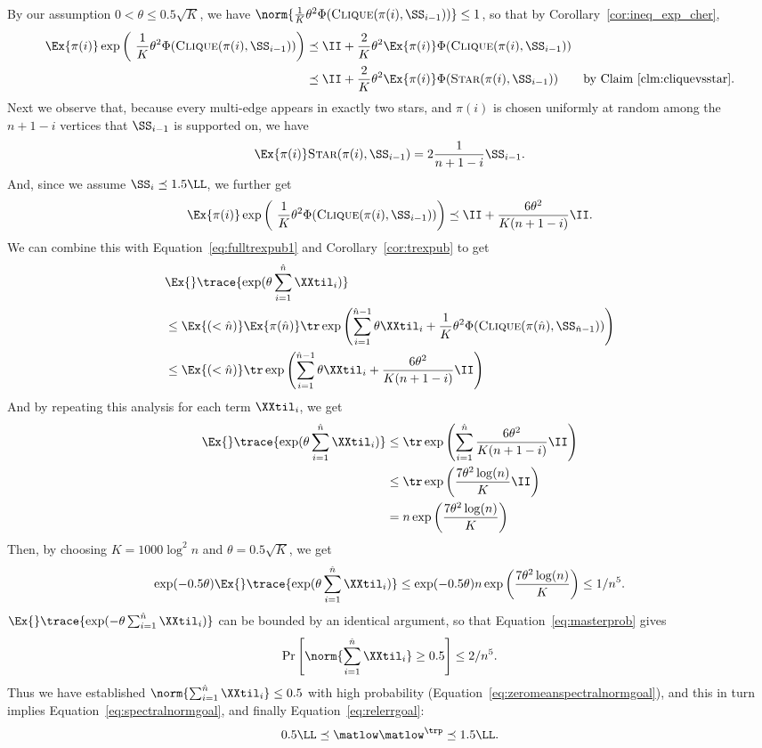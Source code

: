 By our assumption $0 <\theta \leq 0.5\sqrt{K}$, we have
$\norm{\frac{1}{K}\theta^2\Phi(\vcliq{\pi(i)}{\SS_{i-1}})}
\leq 1$, so that by Corollary~\ref{cor:ineq_exp_cher},
\begin{align}
  \Ex{\pi(i)}
  \exp\left(\
     \frac{1}{K}\theta^2\Phi(\vcliq{\pi(i)}{\SS_{i-1}})
  \right)
  &\preceq
  \II
  +
  \frac{2}{K} \theta^2\Ex{\pi(i)}
    \Phi(\vcliq{\pi(i)}{\SS_{i-1}})
  \\
  &\preceq
  \II
  +
  \frac{2}{K} \theta^2\Ex{\pi(i)}
  \Phi(\vstar{\pi(i)}{\SS_{i-1}})
  \tag*{by Claim~\ref{clm:cliquevsstar}.}
\end{align}
Next we observe that, because every multi-edge appears in exactly two
stars, and $\pi(i)$ is chosen uniformly at random among the $n+1-i$
vertices that $\SS_{i-1}$ is supported on, we have
\[
  \Ex{\pi(i)}
  \vstar{\pi(i)}{\SS_{i-1}}
  =
  2\frac{1}{n+1-i}\SS_{i-1}
  .
\]
And, since we assume $\SS_{i} \preceq 1.5 \LL$, we further get
\[
  \Ex{\pi(i)}
  \exp\left(\
     \frac{1}{K}\theta^2\Phi(\vcliq{\pi(i)}{\SS_{i-1}})
  \right)
  \preceq
  \II
  +
  \frac{6\theta^2}{K(n+1-i)}\II
  .
\]
We can combine this with Equation~\eqref{eq:fulltrexpub1} and
Corollary~\ref{cor:trexpub} to get
\begin{align*}
  &  \Ex{}\trace{\exp(\theta\sum_{i = 1}^{\hat{n}}\XXtil_{i} )}
     \\*  \nonumber
  &  \leq
    \Ex{(<\hat{n})} \Ex{\pi(\hat{n})}
   \tr\exp\left(\sum_{i = 1}^{\hat{n}-1}\theta\XXtil_{i}
     +
     \frac{1}{K}\theta^2\Phi(\vcliq{\pi(\hat{n})}{\SS_{\hat{n}-1}})
    \right)
\\  \nonumber
  &  \leq
    \Ex{(<\hat{n})}
   \tr\exp\left(\sum_{i = 1}^{\hat{n}-1}\theta\XXtil_{i}
     +
    \frac{6\theta^2}{K(n+1-i)}\II
  \right)
\end{align*}
And by repeating this analysis for each term $\XXtil_{i}$, we get
\begin{align*}
 \Ex{}\trace{\exp(\theta\sum_{i = 1}^{\hat{n}}\XXtil_{i} )}
&\leq
   \tr\exp\left(\sum_{i = 1}^{\hat{n}}
    \frac{6\theta^2}{K(n+1-i)}\II
    \right)
\\
  &\leq
\tr\exp\left(
    \frac{7\theta^2\log(n)}{K}\II
    \right)
\\
  &=
    n\exp\left(
    \frac{7\theta^2\log(n)}{K}
    \right)
\end{align*}
Then, by choosing $K = 1000 \log^2 n$ and $\theta = 0.5 \sqrt{K}$,
we get
\[
\exp(-0.5 \theta ) \Ex{}\trace{\exp(\theta\sum_{i =
    1}^{\hat{n}}\XXtil_{i} )}
\leq
\exp(-0.5 \theta )
 n\exp\left(
    \frac{7\theta^2\log(n)}{K}
  \right)
  \leq
  1/n^5.
\]
$\Ex{}\trace{\exp(-\theta\sum_{i =
    1}^{\hat{n}}\XXtil_{i} )}$ can be bounded by an identical
argument, so that Equation~\eqref{eq:masterprob} gives
\[
  \Pr\left[ \norm{
\sum_{i =
    1}^{\hat{n}}\XXtil_{i}
  } \geq 0.5 \right] \leq 2/n^5.
  \]
Thus we have established $\norm{
\sum_{i =
    1}^{\hat{n}}\XXtil_{i}
  } \leq 0.5 $ with high probability
  (Equation~\eqref{eq:zeromeanspectralnormgoal}), and this in turn
  implies Equation~\eqref{eq:spectralnormgoal}, and finally
  Equation~\eqref{eq:relerrgoal}:
  \[
0.5 \LL
\preceq
\matlow \matlow^{\trp}
\preceq 1.5 \LL
.
\]

